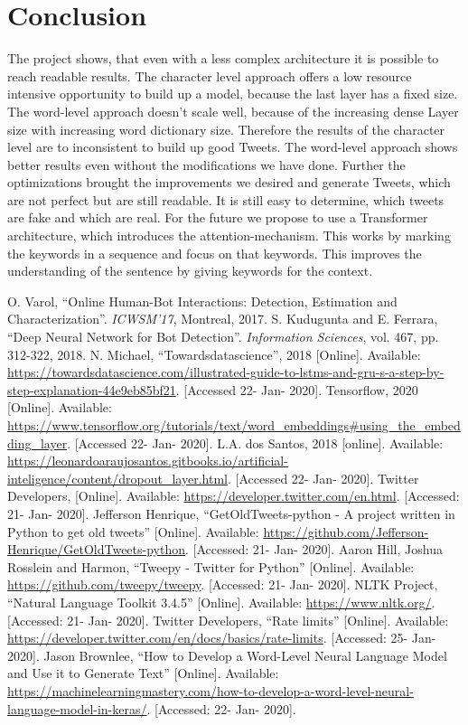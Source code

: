 \documentclass[hidelinks, conference]{IEEEtran}
\begin{document}
\section{Conclusion}

The project shows, that even with a less complex architecture it is possible to reach readable results. The character level approach offers a low resource intensive opportunity to
build up a model, because the last layer has a fixed size. The word-level approach doesn’t scale well, because of the increasing dense Layer size with increasing word dictionary size. Therefore the results of the character level are to inconsistent to build up good Tweets. The word-level approach shows better results even without the modifications we have done. Further the optimizations brought the improvements we desired and generate Tweets, which are not perfect but are still readable. It is still easy to determine, which tweets are fake and which are real. For the future we propose to use a Transformer architecture, which introduces the attention-mechanism. This works by marking the keywords in a sequence and focus on that keywords. This improves the understanding of the sentence by giving keywords for the context.


\begin{thebibliography}{00}
 O. Varol, ``Online Human-Bot Interactions: Detection, Estimation and Characterization''. \textit{ICWSM'17}, Montreal, 2017.
 S. Kudugunta and E. Ferrara, ``Deep Neural Network for Bot Detection''. \textit{Information Sciences}, vol. 467, pp. 312-322, 2018.
 N. Michael, ``Towardsdatascience'', 2018 [Online]. Available: \url{https://towardsdatascience.com/illustrated-guide-to-lstms-and-gru-s-a-step-by-step-explanation-44e9eb85bf21}. [Accessed 22- Jan- 2020].
 Tensorflow, 2020 [Online]. Available: \url{https://www.tensorflow.org/tutorials/text/word_embeddings#using_the_embedding_layer}. [Accessed 22- Jan- 2020].
 L.A. dos Santos, 2018 [online]. Available: \url{https://leonardoaraujosantos.gitbooks.io/artificial-inteligence/content/dropout_layer.html}. [Accessed 22- Jan- 2020].
 Twitter Developers, [Online]. Available: \url{https://developer.twitter.com/en.html}. [Accessed: 21- Jan- 2020].
 Jefferson Henrique, ``GetOldTweets-python - A project written in Python to get old tweets'' [Online]. Available: \url{https://github.com/Jefferson-Henrique/GetOldTweets-python}. [Accessed: 21- Jan- 2020].
 Aaron Hill, Joshua Rosslein and Harmon, ``Tweepy - Twitter for Python'' [Online]. Available: \url{https://github.com/tweepy/tweepy}. [Accessed: 21- Jan- 2020].
 NLTK Project, ``Natural Language Toolkit 3.4.5'' [Online]. Available: \url{https://www.nltk.org/}. [Accessed: 21- Jan- 2020].
 Twitter Developers, ``Rate limits'' [Online]. Available: \url{https://developer.twitter.com/en/docs/basics/rate-limits}. [Accessed: 25- Jan- 2020].
 Jason Brownlee, ``How to Develop a Word-Level Neural Language Model and Use it to Generate Text'' [Online]. Available: \url{https://machinelearningmastery.com/how-to-develop-a-word-level-neural-language-model-in-keras/}. [Accessed: 22- Jan- 2020].
\end{thebibliography}
\end{document}
